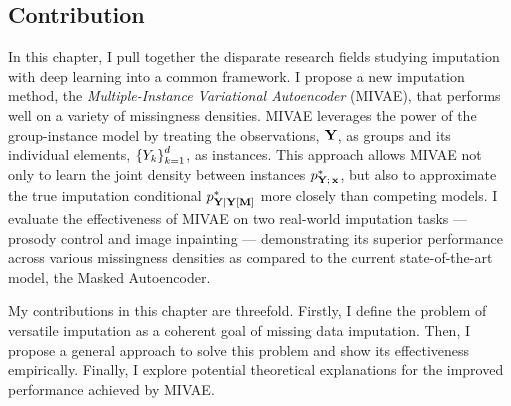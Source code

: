 \documentclass[../thesis.tex]{subfiles}
\begin{document}
\subsection{Contribution}

In this chapter, I pull together the disparate research fields studying imputation with deep learning into a common framework. I propose a new  imputation method, the \textit{Multiple-Instance Variational Autoencoder} (MIVAE), that performs well on a variety of missingness densities. MIVAE leverages the power of the group-instance model by treating the observations, $\mygroup{\myrv{y}}$, as groups and its individual elements, $\left\{ \myrv{y}_k \right\}_{k=1}^{\mycnt{d}}$, as instances. This approach allows MIVAE not only to learn the joint density between instances $\myfunc{p}^{*}_{\mygroup{\myrv{y}}; \, \mygroup{\myvect{x}}}$, but also to approximate the true imputation conditional $\myfunc{p}^{*}_{\mygroup{\myrv{y}} | \mygroup{\myrv{y}} \left[ \mygroup{\myrv{m}} \right]}$ more closely than competing models. I evaluate the effectiveness of MIVAE on two real-world imputation tasks --- prosody control and image inpainting --- demonstrating its superior performance across various missingness densities as compared to the current state-of-the-art model, the Masked Autoencoder. 

My contributions in this chapter are threefold. Firstly, I define the problem of versatile imputation as a coherent goal of missing data imputation. Then, I propose a general approach to solve this problem and show its effectiveness empirically. Finally, I explore potential theoretical explanations for the improved performance achieved by MIVAE.

            
\end{document}
